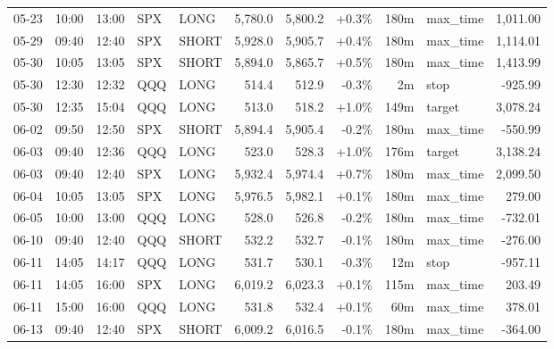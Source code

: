 \documentclass[11pt,a4paper,twoside]{article}
\begin{document}
\begin{center}
\begin{longtable}{>{\color{txtmain}}l l l l l r r r r >{\color{txtmain}}l r}
05-23 & 10:00 & 13:00 & SPX & LONG & 5,780.0 & 5,800.2 & \textcolor{wingreen}{+0.3\%} & 180m & max\_time & \textcolor{wingreen}{1,011.00} \\
05-29 & 09:40 & 12:40 & SPX & SHORT & 5,928.0 & 5,905.7 & \textcolor{wingreen}{+0.4\%} & 180m & max\_time & \textcolor{wingreen}{1,114.01} \\
05-30 & 10:05 & 13:05 & SPX & SHORT & 5,894.0 & 5,865.7 & \textcolor{wingreen}{+0.5\%} & 180m & max\_time & \textcolor{wingreen}{1,413.99} \\
05-30 & 12:30 & 12:32 & QQQ & LONG & 514.4 & 512.9 & \textcolor{lossred}{-0.3\%} & 2m & stop & \textcolor{lossred}{-925.99} \\
05-30 & 12:35 & 15:04 & QQQ & LONG & 513.0 & 518.2 & \textcolor{wingreen}{+1.0\%} & 149m & target & \textcolor{wingreen}{3,078.24} \\
06-02 & 09:50 & 12:50 & SPX & SHORT & 5,894.4 & 5,905.4 & \textcolor{lossred}{-0.2\%} & 180m & max\_time & \textcolor{lossred}{-550.99} \\
06-03 & 09:40 & 12:36 & QQQ & LONG & 523.0 & 528.3 & \textcolor{wingreen}{+1.0\%} & 176m & target & \textcolor{wingreen}{3,138.24} \\
06-03 & 09:40 & 12:40 & SPX & LONG & 5,932.4 & 5,974.4 & \textcolor{wingreen}{+0.7\%} & 180m & max\_time & \textcolor{wingreen}{2,099.50} \\
06-04 & 10:05 & 13:05 & SPX & LONG & 5,976.5 & 5,982.1 & \textcolor{wingreen}{+0.1\%} & 180m & max\_time & \textcolor{wingreen}{279.00} \\
06-05 & 10:00 & 13:00 & QQQ & LONG & 528.0 & 526.8 & \textcolor{lossred}{-0.2\%} & 180m & max\_time & \textcolor{lossred}{-732.01} \\
06-10 & 09:40 & 12:40 & QQQ & SHORT & 532.2 & 532.7 & \textcolor{lossred}{-0.1\%} & 180m & max\_time & \textcolor{lossred}{-276.00} \\
06-11 & 14:05 & 14:17 & QQQ & LONG & 531.7 & 530.1 & \textcolor{lossred}{-0.3\%} & 12m & stop & \textcolor{lossred}{-957.11} \\
06-11 & 14:05 & 16:00 & SPX & LONG & 6,019.2 & 6,023.3 & \textcolor{wingreen}{+0.1\%} & 115m & max\_time & \textcolor{wingreen}{203.49} \\
06-11 & 15:00 & 16:00 & QQQ & LONG & 531.8 & 532.4 & \textcolor{wingreen}{+0.1\%} & 60m & max\_time & \textcolor{wingreen}{378.01} \\
06-13 & 09:40 & 12:40 & SPX & SHORT & 6,009.2 & 6,016.5 & \textcolor{lossred}{-0.1\%} & 180m & max\_time & \textcolor{lossred}{-364.00} \\

\end{longtable}
\end{center}
\end{document}
